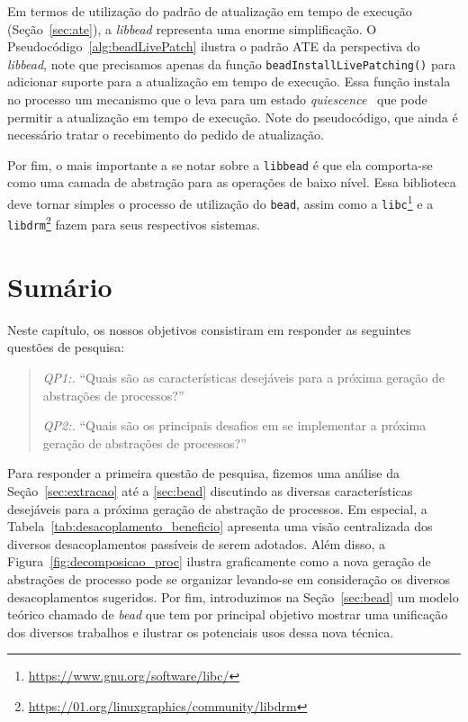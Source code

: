 

Em termos de utilização do padrão de atualização em tempo de execução
(Seção~\ref{sec:ate}), a \emph{libbead} representa uma enorme simplificação. O
Pseudocódigo~\ref{alg:beadLivePatch} ilustra o padrão ATE da perspectiva do
\emph{libbead}, note que precisamos apenas da função
\texttt{beadInstallLivePatching()} para adicionar suporte para a atualização em
tempo de execução. Essa função instala no processo um mecanismo que o leva
para um estado \emph{quiescence}~\citep{quiescence} que pode permitir a
atualização em tempo de execução. Note do pseudocódigo, que ainda é necessário
tratar o recebimento do pedido de atualização.



Por fim, o mais importante a se notar sobre a \texttt{libbead} é que ela
comporta-se como uma camada de abstração para as operações de baixo nível. Essa
biblioteca deve tornar simples o processo de utilização do \texttt{bead}, assim
como a \texttt{libc}\footnote{\url{https://www.gnu.org/software/libc/}} e a
\texttt{libdrm}\footnote{\url{https://01.org/linuxgraphics/community/libdrm}}
fazem para seus respectivos sistemas.

\section{Sumário}

Neste capítulo, os nossos objetivos consistiram em responder as seguintes
questões de pesquisa:

\begin{quote}
 \item \textit{QP1:.} ``Quais são as características desejáveis para a próxima geração de abstrações de processos?''
 \item \textit{QP2:.} ``Quais são os principais desafios em se implementar a próxima geração de abstrações de processos?''
\end{quote}

Para responder a primeira questão de pesquisa, fizemos uma análise da
Seção~\ref{sec:extracao} até a \ref{sec:bead} discutindo as diversas
características desejáveis para a próxima geração de abstração de processos. Em
especial, a Tabela~\ref{tab:desacoplamento_beneficio} apresenta uma visão
centralizada dos diversos desacoplamentos passíveis de serem adotados. Além
disso, a Figura~\ref{fig:decomposicao_proc} ilustra graficamente como a nova
geração de abstrações de processo pode se organizar levando-se em consideração
os diversos desacoplamentos sugeridos. Por fim, introduzimos na
Seção~\ref{sec:bead} um modelo teórico chamado de
\emph{bead} que tem por principal objetivo mostrar uma unificação dos diversos
trabalhos e ilustrar os potenciais usos dessa nova técnica.

